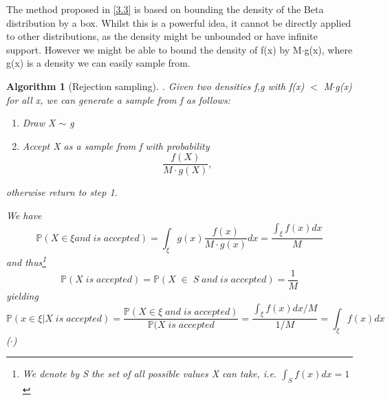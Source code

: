 \documentclass[a4paper,10pt]{article}
\newtheorem{algorithm}[theorem]{Algorithm}
\newcommand{\lt}{<}
\newenvironment{proof}[1][Proof]{\begin{trivlist}
\item[\hskip \labelsep {\bfseries #1}]}{\end{trivlist}}
\begin{document}
  The method proposed in \ref{3.3} is based on bounding the density of the Beta distribution by a box. Whilst
  this is a powerful idea, it cannot be directly applied to other distributions, as the density might be unbounded
  or have infinite support. However we might be able to bound the density of f(x) by M$\cdot$g(x), where g(x) is a 
  density we can easily sample from. 
\begin{algorithm}[Rejection sampling].
Given two densities f,g with f(x) $\lt$ M$\cdot$g(x) for all x, we can generate a sample from f as follows:
\begin{enumerate}
 \item Draw X $\sim$ g
 \item Accept X as a sample from f with probability
   \begin{equation*}
    \frac{f(X)}{M\cdot g(X)},
   \end{equation*}

\end{enumerate}
otherwise return to step 1.
\begin{proof}
 We have
 \begin{equation}
  \mathbb{P}(X \in \xi and\;is\;accepted) = \int_{\xi} g(x) \dfrac{f(x)}{M \cdot g(x)} dx = \dfrac{\int_{\xi}f(x) dx}{M}
 \end{equation}
 and thus\footnote{We denote by S the set of all possible values X can take, i.e. $\int_{S} f(x)dx = 1$}
 \begin{equation}
  \mathbb{P}(X\;is\;accepted)= \mathbb{P}( X\;\in\;S\;and\;is\;accepted) = \dfrac{1}{M}
 \end{equation}yielding \begin{equation}
\mathbb{P}(x \in \xi| X\;is\;accepted) = \dfrac{\mathbb{P}(X \in \xi\;and\;is\;accepted)}{\mathbb{P}(X\;is\;accepted}
  = \dfrac{\int_{\xi} f(x) dx/M}{1/M} = \int_{\xi} f(x)dx
 \end{equation}
 ($\cdot$)
 \end{proof}

 
\end{algorithm}
\end{document}
